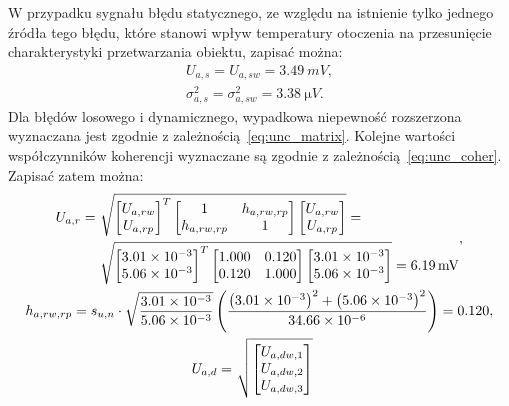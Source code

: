 W przypadku sygnału błędu statycznego, ze względu na istnienie tylko jednego źródła tego błędu, które stanowi wpływ temperatury otoczenia na przesunięcie charakterystyki przetwarzania obiektu, zapisać można:
\begin{gather}
U_{a,s} = U_{a,sw} = \qty{3.49}{mV} \label{eq:sym_parta_uncert_stat}, \\
\sigma_{a,s}^{2} = \sigma_{a,sw}^{2} = \qty{3.38}{\micro V} \label{eq:sym_parta_var_stat}.
\end{gather}
Dla błędów losowego i dynamicznego, wypadkowa niepewność rozszerzona wyznaczana jest zgodnie z zależnością~\eqref{eq:unc_matrix}. Kolejne wartości współczynników koherencji wyznaczane są zgodnie z zależnością~\eqref{eq:unc_coher}. Zapisać zatem można:
\begin{gather}
\begin{split}
U_{a,r} =~
& \sqrt{
\begin{bmatrix}
U_{a,rw} \\ U_{a,rp}
\end{bmatrix}^{T}
\begin{bmatrix}
1           & h_{a,rw,rp} \\
h_{a,rw,rp} & 1
\end{bmatrix}
\begin{bmatrix}
U_{a,rw} \\ U_{a,rp}
\end{bmatrix}} =~\\
& \sqrt{
\begin{bmatrix}
\num{3.01e-3} \\ \num{5.06e-3}
\end{bmatrix}^{T}
\begin{bmatrix}
1.000 & 0.120 \\
0.120 & 1.000
\end{bmatrix}
\begin{bmatrix}
\num{3.01e-3} \\ \num{5.06e-3}
\end{bmatrix}} = \qty{6.19}{mV}
\end{split}
\label{eq:sym_parta_uncert_rand}, \\
h_{a,rw,rp} = s_{u,n} \cdot \sqrt{\frac{\num{3.01e-3}}{\num{5.06e-3}}} \left( \frac{\left(\num{3.01e-3}\right)^{2} + \left(\num{5.06e-3}\right)^{2}}{\num{34.66e-6}} \right) = 0.120 \label{eq:sym_parta_coher_rw_rp}, \\
\begin{split}
U_{a,d} = ~ & \sqrt{
\begin{bmatrix}
U_{a,dw,1} \\ U_{a,dw,2} \\ U_{a,dw,3}

\end{bmatrix}}
\end{split}
\end{gather}
